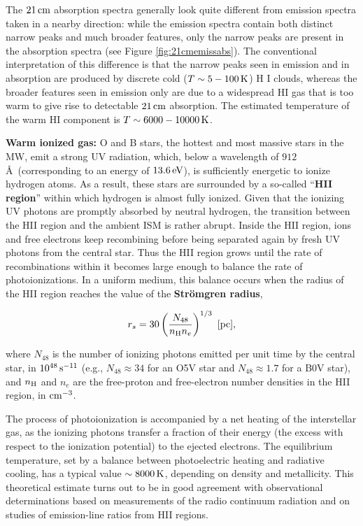 \documentclass[a4paper,10pt]{article}
\begin{document}
{\noindent}The $21\,{\rm cm}$ absorption spectra generally look quite different from emission spectra taken in a nearby direction: while the emission spectra contain both distinct narrow peaks and much broader features, only the narrow peaks are present in the absorption spectra (see Figure \ref{fig:21cmemissabs}). The conventional interpretation of this difference is that the narrow peaks seen in emission and in absorption are produced by discrete cold ($T\sim5-100\,{\rm K}$) H I clouds, whereas the broader features seen in emission only are due to a widespread HI gas that is too warm to give rise to detectable $21\,{\rm cm}$ absorption. The estimated temperature of the warm HI component is $T\sim6000-10000\,{\rm K}$.

{\noindent}\textbf{Warm ionized gas:} O and B stars, the hottest and most massive stars in the MW, emit a strong UV radiation, which, below a wavelength of $912$\AA~(corresponding to an energy of $13.6\,{\rm eV}$), is sufficiently energetic to ionize hydrogen atoms. As a result, these stars are surrounded by a so-called ``\textbf{HII region}'' within which hydrogen is almost fully ionized. Given that the ionizing UV photons are promptly absorbed by neutral hydrogen, the transition between the HII region and the ambient ISM is rather abrupt. Inside the HII region, ions and free electrons keep recombining before being separated again by fresh UV photons from the central star. Thus the HII region grows until the rate of recombinations within it becomes large enough to balance the rate of photoionizations. In a uniform medium, this balance occurs when the radius of the HII region reaches the value of the \textbf{Str\"omgren radius},

\begin{align*}
    r_s = 30 \left(\frac{N_{48}}{n_{\rm H}n_e}\right)^{1/3} ~ [{\rm pc}],
\end{align*}

{\noindent}where $N_{48}$ is the number of ionizing photons emitted per unit time by the central star, in $10^{48}\,{\rm s^{-11}}$ (e.g., $N_{48}\approx34$ for an O5V star and $N_{48}\approx1.7$ for a B0V star), and $n_{\rm H}$ and $n_e$ are the free-proton and free-electron number densities in the HII region, in ${\rm cm^{-3}}$.

{\noindent}The process of photoionization is accompanied by a
net heating of the interstellar gas, as the ionizing photons transfer a fraction of their energy (the excess with respect to the ionization potential) to the ejected electrons. The equilibrium temperature, set by a balance between photoelectric heating and radiative cooling, has a typical value $\sim8000\,{\rm K}$, depending on density and metallicity. This theoretical estimate turns out to be in good agreement with observational determinations based on measurements of the radio continuum radiation and on studies of emission-line ratios from HII regions.
\end{document}
